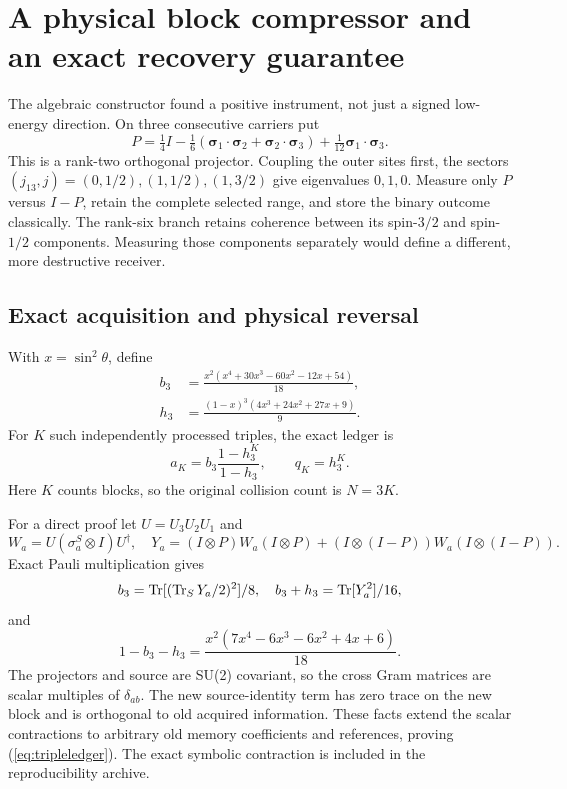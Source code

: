 \section{A physical block compressor and an exact recovery guarantee}
The algebraic constructor found a positive instrument, not just a signed
low-energy direction. On three consecutive carriers put
\[
 P=\tfrac14 I-\tfrac16(\boldsymbol\sigma_1\!\cdot\!\boldsymbol\sigma_2+
 \boldsymbol\sigma_2\!\cdot\!\boldsymbol\sigma_3)
 +\tfrac1{12}\boldsymbol\sigma_1\!\cdot\!\boldsymbol\sigma_3.
\]
This is a rank-two orthogonal projector. Coupling the outer sites first,
the sectors $(j_{13},j)=(0,1/2),(1,1/2),(1,3/2)$ give eigenvalues $0,1,0$.
Measure only $P$ versus $I-P$, retain the complete selected range, and store
the binary outcome classically. The rank-six branch retains coherence
between its spin-$3/2$ and spin-$1/2$ components. Measuring those components
separately would define a different, more destructive receiver.

\subsection{Exact acquisition and physical reversal}
With $x=\sin^2\theta$, define
\begin{align}
 b_3&=\frac{x^2(x^4+30x^3-60x^2-12x+54)}{18},\\
 h_3&=\frac{(1-x)^3(4x^3+24x^2+27x+9)}9.
\end{align}
For $K$ such independently processed triples, the exact ledger is
\begin{equation}
 a_K=b_3\frac{1-h_3^K}{1-h_3},\qquad q_K=h_3^K.\label{eq:tripleledger}
\end{equation}
Here $K$ counts blocks, so the original collision count is $N=3K$.

For a direct proof let $U=U_3U_2U_1$ and
\[
 W_a=U(\sigma_a^S\otimes I)U^\dagger,\quad
 Y_a=(I\otimes P)W_a(I\otimes P)
 +(I\otimes(I-P))W_a(I\otimes(I-P)).
\]
Exact Pauli multiplication gives
\[
 b_3=\operatorname{Tr}[(\operatorname{Tr}_SY_a/2)^2]/8,\quad
 b_3+h_3=\operatorname{Tr}[Y_a^2]/16,
\]
and
\[
 1-b_3-h_3=\frac{x^2(7x^4-6x^3-6x^2+4x+6)}{18}.
\]
The projectors and source are SU(2) covariant, so the cross Gram matrices
are scalar multiples of $\delta_{ab}$. The new source-identity term has
zero trace on the new block and is orthogonal to old acquired information.
These facts extend the scalar contractions to arbitrary old memory
coefficients and references, proving (\ref{eq:tripleledger}). The exact
symbolic contraction is included in the reproducibility archive.

